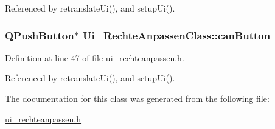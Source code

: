 Referenced by retranslateUi(), and setupUi().\hypertarget{class_ui___rechte_anpassen_class_de48ff73e98746448879fcabc934d9a6}{
\subsubsection[canButton]{\setlength{\rightskip}{0pt plus 5cm}QPushButton$\ast$ {\bf Ui\_\-RechteAnpassenClass::canButton}}}
\label{class_ui___rechte_anpassen_class_de48ff73e98746448879fcabc934d9a6}




Definition at line 47 of file ui\_\-rechteanpassen.h.

Referenced by retranslateUi(), and setupUi().

The documentation for this class was generated from the following file:\begin{CompactItemize}
\item 
\hyperlink{ui__rechteanpassen_8h}{ui\_\-rechteanpassen.h}\end{CompactItemize}
